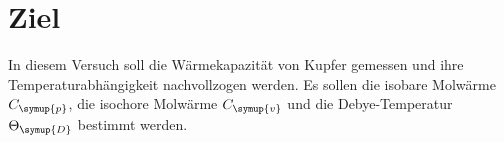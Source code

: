 \section{Ziel}
\label{sec:Ziel}
In diesem Versuch soll die Wärmekapazität von Kupfer gemessen und ihre Temperaturabhängigkeit nachvollzogen werden. Es sollen die isobare Molwärme
$C_{\symup{p}}$, die isochore Molwärme $C_{\symup{v}}$ und die Debye-Temperatur
$\Theta_{\symup{D}}$ bestimmt werden.
